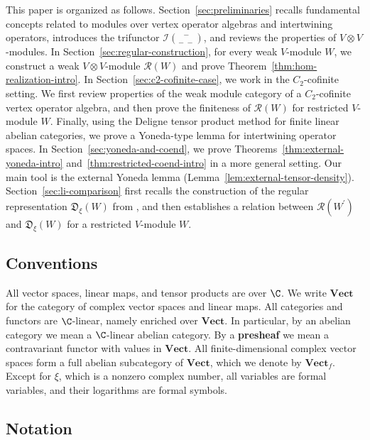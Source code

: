 \documentclass[12pt, english]{article}
\numberwithin{equation}{section}
\theoremstyle{plain}
\theoremstyle{definition}
\theoremstyle{remark}
\begin{document}
	
	This paper is organized as follows. Section~\ref{sec:preliminaries} recalls fundamental concepts related to modules over vertex operator algebras and intertwining operators, introduces the trifunctor $\mathcal{I} \binom{-}{- \; -}$, and reviews the properties of $V \otimes V$-modules. In Section~\ref{sec:regular-construction}, for every weak $V$-module $W$, we construct a weak $V \otimes V$-module $\mathcal{R}(W)$ and prove Theorem~\ref{thm:hom-realization-intro}. In Section~\ref{sec:c2-cofinite-case}, we work in the $C_2$-cofinite setting. We first review properties of the weak module category of a $C_2$-cofinite vertex operator algebra, and then prove the finiteness of $\mathcal{R}(W)$ for restricted $V$-module $W$. Finally, using the Deligne tensor product method for finite linear abelian categories, we prove a Yoneda-type lemma for intertwining operator spaces. In Section~\ref{sec:yoneda-and-coend}, we prove Theorems~\ref{thm:external-yoneda-intro} and~\ref{thm:restricted-coend-intro} in a more general setting. Our main tool is the external Yoneda lemma (Lemma~\ref{lem:external-tensor-density}).
	Section~\ref{sec:li-comparison} first recalls the construction of the regular representation $\mathfrak{D}_{\xi}(W)$ from \cite{Li02}, and then establishes a relation between $\mathcal{R}(W^\prime)$ and $\mathfrak{D}_\xi(W)$ for a restricted $V$-module $W$.
	
	
	
	
	
	
	\subsection*{Conventions}
	
	All vector spaces, linear maps, and tensor products are over $\C$.
	We write $\mathbf{Vect}$ for the category of complex vector spaces and linear maps. 
	All categories and functors are $\C$-linear, namely enriched over $\mathbf{Vect}$. In particular, by an abelian category we mean a $\C$-linear abelian category. 
	By a \textbf{presheaf} we mean a contravariant functor with values in $\mathbf{Vect}$.
	All finite-dimensional complex vector spaces form a full abelian subcategory of $\mathbf{Vect}$, which we denote by $\mathbf{Vect}_f$.
	Except for $\xi$, which is a nonzero complex number, all variables are formal variables, and their logarithms are formal symbols.
	
	\subsection*{Notation}
	
\end{document}
